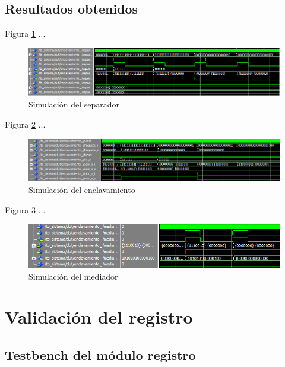 	\subsection{Resultados obtenidos}
				
		Figura \ref{fig:Test_Separador} ...
		
		\begin{figure}[h]
		\centering
		\includegraphics[scale=0.6]{./Figures/Test/Separador}
			\caption{Simulación del separador}
			\label{fig:Test_Separador}
		\end{figure}
		
		Figura \ref{fig:Test_Enclavamiento} ...
		
		\begin{figure}[h]
		\centering
		\includegraphics[scale=0.65]{./Figures/Test/Enclavamiento}
			\caption{Simulación del enclavamiento}
			\label{fig:Test_Enclavamiento}
		\end{figure}
		
		Figura \ref{fig:Test_Mediador} ...
		
		\begin{figure}[h]
		\centering
		\includegraphics[scale=0.8]{./Figures/Test/Mediador}
			\caption{Simulación del mediador}
			\label{fig:Test_Mediador}
		\end{figure}
		

\section{Validación del registro}

	\subsection{Testbench del módulo registro}
			
